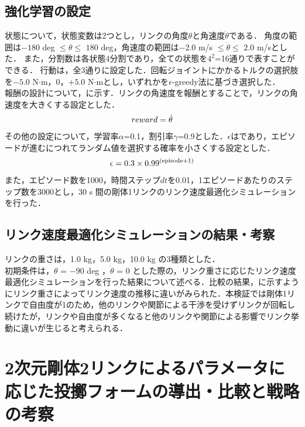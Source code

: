 \begin{small}
\subsection{強化学習の設定}
状態について，状態変数は2つとし，リンクの角度$\theta$と角速度$\dot{\theta}$である．
角度の範囲は$-180$ deg $\leq \theta \leq$ $180$ deg，角速度の範囲は$-2.0$ m/s $\leq \dot{\theta} \leq$ $2.0$ m/sとした．
また，分割数は各状態4分割であり，全ての状態を$4^{2}$=16通りで表すことができる．
行動は，全3通りに設定した．回転ジョイントにかかるトルクの選択肢を$-5.0$ N$\cdot$m，$0$，$+5.0$ N$\cdot$mとし，いずれかを$\epsilon$-greedy法に基づき選択した．\\
報酬の設計について，に示す．リンクの角速度を報酬とすることで，リンクの角速度を大きくする設定とした．
\begin{eqnarray}
  \equlabel{3}
  reward = \dot{\theta}
\end{eqnarray}
その他の設定について，学習率$\alpha$=0.1，割引率$\gamma$=0.9とした．$\epsilon$はであり，エピソードが進むにつれてランダム値を選択する確率を小さくする設定とした．
\begin{eqnarray}
  \equlabel{4}
  \epsilon = 0.3 \times 0.99^{(\mathrm{episode} + 1)}
\end{eqnarray}
また，エピソード数を1000，時間ステップ$dt$を0.01，1エピソードあたりのステップ数を3000とし，30 s 間の剛体1リンクのリンク速度最適化シミュレーションを行った．
\subsection{リンク速度最適化シミュレーションの結果・考察}
リンクの重さは，1.0 kg，5.0 kg，10.0 kg の3種類とした．\\
初期条件は，$\theta$ = $-90$ deg ，$\dot{\theta}$ = 0 とした際の，リンク重さに応じたリンク速度最適化シミュレーションを行った結果について述べる．比較の結果，に示すようにリンク重さによってリンク速度の推移に違いがみられた．本検証では剛体1リンクで自由度が1のため，他のリンクや関節による干渉を受けずリンクが回転し続けたが，リンクや自由度が多くなると他のリンクや関節による影響でリンク挙動に違いが生じると考えられる．
\section{2次元剛体2リンクによるパラメータに応じた投擲フォームの導出・比較と戦略の考察}

\end{small}
